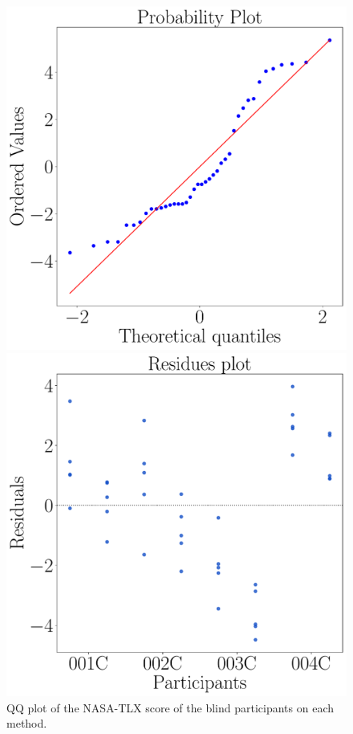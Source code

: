 \begin{figure}[!htb]
    \centering
    \begin{minipage}{0.45\textwidth}
        \centering
        \includegraphics[width = \textwidth]{Resultados/Nasa/Figuras/pdf/qqplot_nasa_avg_two_way_blind.pdf}
        \caption{QQ plot of the NASA-TLX score of the blind participants on each method.}
        \label{fig:qqplot_nasa_avg_two_way_blind}
    \end{minipage}
    \begin{minipage}{0.075\textwidth}
        \hfill
    \end{minipage}
    \begin{minipage}{0.45\textwidth}
        \centering
        \includegraphics[width = \textwidth]{Resultados/Nasa/Figuras/pdf/residplot_nasa_avg_two_way_blind.pdf}

\end{minipage}
\end{figure}
